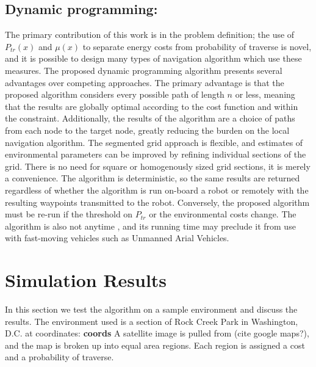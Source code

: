 \documentclass[journal]{IEEEtran}
\begin{document}
\subsection{Dynamic programming:}
The primary contribution of this work is in the problem definition; the use of $P_{tr}(x)$ and $\mu(x)$ to separate energy costs from probability of traverse is novel, and it is possible to design many types of navigation algorithm which use these measures. 
The proposed dynamic programming algorithm presents several advantages over competing approaches.
The primary advantage is that the proposed algorithm considers every possible path of length $n$ or less, meaning that the results are globally optimal according to the cost function and within the constraint. 
Additionally, the results of the algorithm are a choice of paths from each node to the target node, greatly reducing the burden on the local navigation algorithm.
The segmented grid approach is flexible, and estimates of environmental parameters can be improved by refining individual sections of the grid. There is no need for square or homogenously sized grid sections, it is merely a convenience.
The algorithm is deterministic, so the same results are returned regardless of whether the algorithm is run on-board a robot or remotely with the resulting waypoints transmitted to the robot.
Conversely, the proposed algorithm must be re-run if the threshold on $P_{tr}$ or the environmental costs change. 
The algorithm is also not anytime \cite{definition of anytime}, and its running time may preclude it from use with fast-moving vehicles such as Unmanned Arial Vehicles.



\section{Simulation Results}
In this section we test the algorithm on a sample environment and discuss the results. The environment used is a section of Rock Creek Park in Washington, D.C. at coordinates: \textbf{coords}
A satellite image is pulled from (cite google maps?), and the map is broken up into equal area regions.
Each region is assigned a cost and a probability of traverse.
\end{document}
